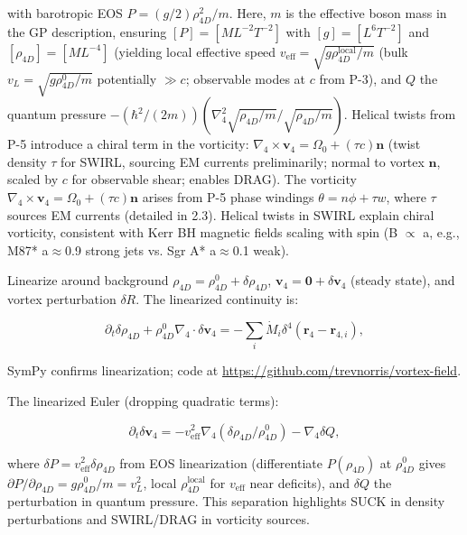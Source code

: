with barotropic EOS $P = (g/2) \rho_{4D}^2 / m$. Here, $m$ is the effective boson mass in the GP description, ensuring $[P] = [M L^{-2} T^{-2}]$ with $[g] = [L^6 T^{-2}]$ and $[\rho_{4D}] = [M L^{-4}]$ (yielding local effective speed $v_{\text{eff}} = \sqrt{g \rho_{4D}^{\text{local}} / m}$ (bulk $v_L = \sqrt{g \rho_{4D}^0 / m}$ potentially $\gg c$; observable modes at $c$ from P-3), and $Q$ the quantum pressure $-(\hbar^2 / (2m)) (\nabla_4^2 \sqrt{\rho_{4D}/m} / \sqrt{\rho_{4D}/m})$. Helical twists from P-5 introduce a chiral term in the vorticity: $\nabla_4 \times \mathbf{v}_4 = \Omega_0 + (\tau c) \mathbf{n}$ (twist density $\tau$ for SWIRL, sourcing EM currents preliminarily; normal to vortex $\mathbf{n}$, scaled by $c$ for observable shear; enables DRAG). The vorticity $\nabla_4 \times \mathbf{v}_4 = \Omega_0 + (\tau c) \mathbf{n}$ arises from P-5 phase windings $\theta = n\phi + \tau w$, where $\tau$ sources EM currents (detailed in 2.3). Helical twists in SWIRL explain chiral vorticity, consistent with Kerr BH magnetic fields scaling with spin (B $\propto$ a, e.g., M87* a$\approx$0.9 strong jets vs. Sgr A* a$\approx$0.1 weak).

Linearize around background $\rho_{4D} = \rho_{4D}^0 + \delta \rho_{4D}$, $\mathbf{v}_4 = \mathbf{0} + \delta \mathbf{v}_4$ (steady state), and vortex perturbation $\delta R$. The linearized continuity is:

\begin{equation}
\partial_t \delta \rho_{4D} + \rho_{4D}^0 \nabla_4 \cdot \delta \mathbf{v}_4 = -\sum_i \dot{M}_i \delta^4(\mathbf{r}_4 - \mathbf{r}_{4,i}),
\end{equation}

SymPy confirms linearization; code at \url{https://github.com/trevnorris/vortex-field}.

The linearized Euler (dropping quadratic terms):

\begin{equation}
\partial_t \delta \mathbf{v}_4 = -v_{\text{eff}}^2 \nabla_4 (\delta \rho_{4D} / \rho_{4D}^0) - \nabla_4 \delta Q,
\end{equation}

where $\delta P = v_{\text{eff}}^2 \delta \rho_{4D}$ from EOS linearization (differentiate $P(\rho_{4D})$ at $\rho_{4D}^0$ gives $\partial P / \partial \rho_{4D} = g \rho_{4D}^0 / m = v_L^2$, local $\rho_{4D}^{\text{local}}$ for $v_{\text{eff}}$ near deficits), and $\delta Q$ the perturbation in quantum pressure. This separation highlights SUCK in density perturbations and SWIRL/DRAG in vorticity sources.

